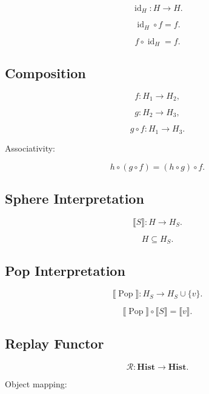 \documentclass[12pt,oneside]{article}
\theoremstyle{definition}
\theoremstyle{remark}
\begin{document}
\[
\operatorname{id}_H
:
H
\rightarrow
H.
\]

\[
\operatorname{id}_H
\circ
f
=
f.
\]

\[
f
\circ
\operatorname{id}_H
=
f.
\]

\subsection*{Composition}

\[
f
:
H_1
\rightarrow
H_2,
\]

\[
g
:
H_2
\rightarrow
H_3,
\]

\[
g\circ f
:
H_1
\rightarrow
H_3.
\]

Associativity:

\[
h\circ(g\circ f)
=
(h\circ g)\circ f.
\]

\subsection*{Sphere Interpretation}

\[
\llbracket
S
\rrbracket
:
H
\rightarrow
H_S.
\]

\[
H
\subseteq
H_S.
\]

\subsection*{Pop Interpretation}

\[
\llbracket
\operatorname{Pop}
\rrbracket
:
H_S
\rightarrow
H_S\cup\{v\}.
\]

\[
\llbracket
\operatorname{Pop}
\rrbracket
\circ
\llbracket
S
\rrbracket
=
\llbracket
v
\rrbracket.
\]

\subsection*{Replay Functor}

\[
\mathcal R
:
\mathbf{Hist}
\rightarrow
\mathbf{Hist}.
\]

Object mapping:
\end{document}
